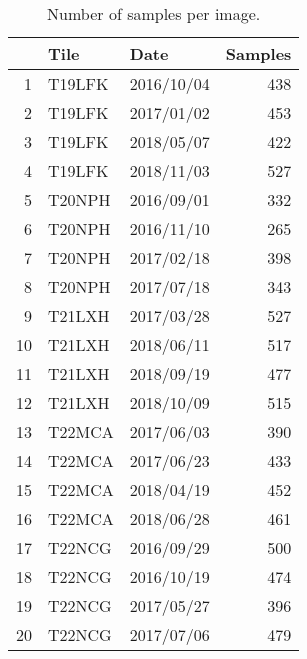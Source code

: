 \begin{table}[ht]
\centering
\begin{tabular}{rllr}
  \hline
 & Tile & Date & Samples \\ 
  \hline
1 & T19LFK & 2016/10/04 & 438 \\ 
  2 & T19LFK & 2017/01/02 & 453 \\ 
  3 & T19LFK & 2018/05/07 & 422 \\ 
  4 & T19LFK & 2018/11/03 & 527 \\ 
  5 & T20NPH & 2016/09/01 & 332 \\ 
  6 & T20NPH & 2016/11/10 & 265 \\ 
  7 & T20NPH & 2017/02/18 & 398 \\ 
  8 & T20NPH & 2017/07/18 & 343 \\ 
  9 & T21LXH & 2017/03/28 & 527 \\ 
  10 & T21LXH & 2018/06/11 & 517 \\ 
  11 & T21LXH & 2018/09/19 & 477 \\ 
  12 & T21LXH & 2018/10/09 & 515 \\ 
  13 & T22MCA & 2017/06/03 & 390 \\ 
  14 & T22MCA & 2017/06/23 & 433 \\ 
  15 & T22MCA & 2018/04/19 & 452 \\ 
  16 & T22MCA & 2018/06/28 & 461 \\ 
  17 & T22NCG & 2016/09/29 & 500 \\ 
  18 & T22NCG & 2016/10/19 & 474 \\ 
  19 & T22NCG & 2017/05/27 & 396 \\ 
  20 & T22NCG & 2017/07/06 & 479 \\ 
   \hline
\end{tabular}
\caption{Number of samples per image.} 
\end{table}
